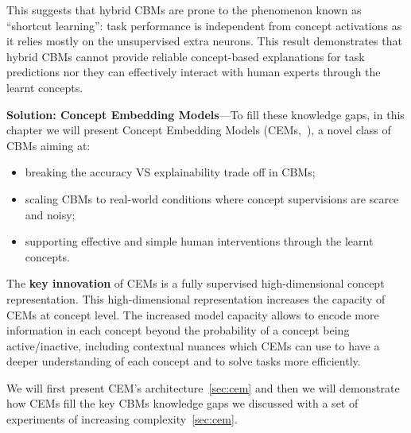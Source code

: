 \documentclass[withindex,glossary]{cam-thesis}
\theoremstyle{plain}
\theoremstyle{definition}
\theoremstyle{remark}
\begin{document}
This suggests that hybrid CBMs are prone to the phenomenon known as ``shortcut learning'': task performance is independent from concept activations as it relies mostly on the unsupervised extra neurons. This result demonstrates that hybrid CBMs cannot provide reliable concept-based explanations for task predictions nor they can effectively interact with human experts through the learnt concepts.

\textbf{Solution: Concept Embedding Models}---To fill these knowledge gaps, in this chapter we will present Concept Embedding Models (CEMs,~\citep{zarlenga2022concept}), a novel class of CBMs aiming at:
\begin{itemize}
	\item breaking the accuracy VS explainability trade off in CBMs;
	\item scaling CBMs to real-world conditions where concept supervisions are scarce and noisy;
	\item supporting effective and simple human interventions through the learnt concepts.
\end{itemize}
The \textbf{key innovation} of CEMs is a fully supervised high-dimensional concept representation. This high-dimensional representation increases the capacity of CEMs at concept level. The increased model capacity allows to encode more information in each concept beyond the probability of a concept being active/inactive, including contextual nuances which CEMs can use to have a deeper understanding of each concept and to solve tasks more efficiently.

We will first present CEM's architecture~\ref{sec:cem} and then we will demonstrate how CEMs fill the key CBMs knowledge gaps we discussed with a set of experiments of increasing complexity~\ref{sec:cem}.

%
%


%
%
\end{document}
